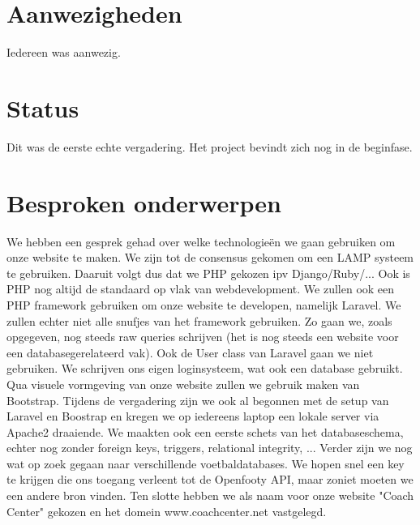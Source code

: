 \documentclass[11pt, a4paper]{article}
\begin{document}
\title{}
\author{Groep A\\ Week 2}
\date{20 februari 2014}
\maketitle

\section{Aanwezigheden}
Iedereen was aanwezig.
\section{Status}
Dit was de eerste echte vergadering. Het project bevindt zich nog in de beginfase.

\section{Besproken onderwerpen}
We hebben een gesprek gehad over welke technologie\"en we gaan gebruiken om onze website te maken. We zijn tot de consensus gekomen om een LAMP systeem te gebruiken. Daaruit volgt dus dat we PHP gekozen ipv Django/Ruby/... Ook is PHP nog altijd de standaard op vlak van webdevelopment.
\newline
We zullen ook een PHP framework gebruiken om onze website te developen, namelijk Laravel. We zullen echter niet alle snufjes van het framework gebruiken. Zo gaan we, zoals opgegeven, nog steeds raw queries  schrijven (het is nog steeds een website voor een databasegerelateerd vak). Ook de User class van Laravel gaan we niet gebruiken. We schrijven ons eigen loginsysteem, wat ook een database gebruikt.
\newline
Qua visuele vormgeving van onze website zullen we gebruik maken van Bootstrap.
\newline
Tijdens de vergadering zijn we ook al begonnen met de setup van Laravel en Boostrap en kregen we op iedereens laptop een lokale server via Apache2 draaiende. We maakten ook een eerste schets van het databaseschema, echter nog zonder foreign keys, triggers, relational integrity, ...
\newline
Verder zijn we nog wat op zoek gegaan naar verschillende voetbaldatabases. We hopen snel een key te krijgen die ons toegang verleent tot de Openfooty API, maar zoniet moeten we een andere bron vinden.
\newline
Ten slotte hebben we als naam voor onze website "Coach Center" gekozen en het domein www.coachcenter.net vastgelegd.
\end{document}
